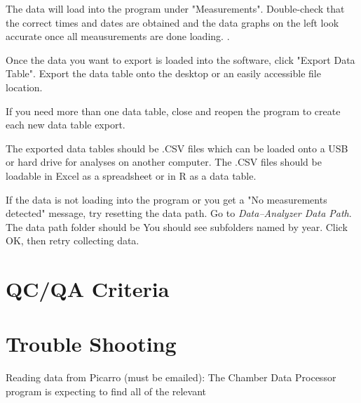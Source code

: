 \documentclass[12pt]{../SOP3}\usepackage[]{graphicx}\usepackage[]{color}
\begin{document}
\NP The data will load into the program under "Measurements". Double-check that the correct times and dates are obtained and the data graphs on the left look accurate once all meausurements are done loading. .

\NP Once the data you want to export is loaded into the software, click "Export Data Table". Export the data table onto the desktop or an easily accessible file location. 

\NP If you need more than one data table, close and reopen the program to create each new data table export. 

\NP The exported data tables should be .CSV files which can be loaded onto a USB or hard drive for analyses on another computer. The .CSV files should be loadable in Excel as a spreadsheet or in R as a data table. 

\NP If the data is not loading into the program or you get a "No measurements detected" message, try resetting the data path. Go to \textit{Data--Analyzer Data Path}. The data path folder should be %
You should see subfolders named by year. Click OK, then retry collecting data. 


\section{QC/QA Criteria}


\section{Trouble Shooting}
\NP Reading data from Picarro (must be emailed):
The Chamber Data Processor program is expecting to find all of the relevant 
\end{document}
